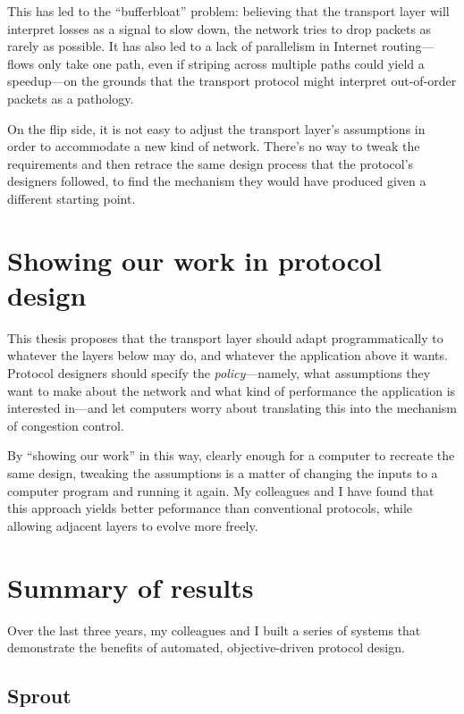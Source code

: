 This has led to the ``bufferbloat''\cite{bufferbloat} problem:
believing that the transport layer will interpret losses as a signal
to slow down, the network tries to drop packets as rarely as
possible. It has also led to a lack of parallelism in Internet
routing---flows only take one path, even if striping across
multiple paths could yield a speedup---on the grounds that the
transport protocol might interpret out-of-order packets as a
pathology.

On the flip side, it is not easy to adjust the transport
layer's assumptions in order to accommodate a new kind of
network. There's no way to tweak the requirements and then retrace the
same design process that the protocol's designers followed, to find the
mechanism they would have produced given a different starting point.

\section{Showing our work in protocol design}

This thesis proposes that the transport layer should adapt
programmatically to whatever the layers below may do, and whatever the
application above it wants. Protocol designers should specify the
\emph{policy}---namely, what assumptions they want to make about the
network and what kind of performance the application is interested
in---and let computers worry about translating this into the mechanism
of congestion control.

By ``showing our work'' in this way, clearly enough for a computer to
recreate the same design, tweaking the assumptions is a matter of
changing the inputs to a computer program and running it again. My
colleagues and I have found that this approach yields better
peformance than conventional protocols, while allowing adjacent layers
to evolve more freely.

\section{Summary of results}

Over the last three years, my colleagues and I built a series of
systems that demonstrate the benefits of automated, objective-driven
protocol design.

\subsection{Sprout}

